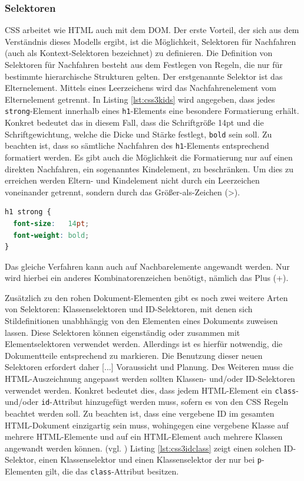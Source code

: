 \subsubsection{Selektoren} CSS arbeitet wie HTML auch mit dem DOM. \glqq Der erste Vorteil, der sich aus dem Verständnis dieses Modells ergibt, ist die Möglichkeit, Selektoren für Nachfahren (auch als Kontext-Selektoren bezeichnet) zu definieren. Die Definition von Selektoren für Nachfahren besteht aus dem Festlegen von Regeln, die nur für bestimmte hierarchische Strukturen gelten.\grqq{}\cite[S.48]{MeyeCasc2005} Der erstgenannte Selektor ist das Elternelement. Mittels eines Leerzeichens wird das Nachfahrenelement vom Elternelement getrennt. In Listing \ref{lst:css3kids} wird angegeben, dass jedes \texttt{strong}-Element innerhalb eines \texttt{h1}-Elements eine besondere Formatierung erhält. Konkret bedeutet das in diesem Fall, dass die Schriftgröße 14pt und die Schriftgewichtung, welche die Dicke und Stärke festlegt, \texttt{bold} sein soll. Zu beachten ist, dass so sämtliche Nachfahren des \texttt{h1}-Elements entsprechend formatiert werden. Es gibt auch die Möglichkeit die Formatierung nur auf einen direkten Nachfahren, ein sogenanntes Kindelement, zu beschränken. Um dies zu erreichen werden Eltern- und Kindelement nicht durch ein Leerzeichen voneinander getrennt, sondern durch das Größer-als-Zeichen (\textgreater).

\vspace{1em}
\begin{lstlisting}[language=CSS, caption=CSS3 Selektoren für Nachfahren, label=lst:css3kids]
h1 strong {
  font-size:   14pt;
  font-weight: bold;
}
\end{lstlisting}

Das gleiche Verfahren kann auch auf Nachbarelemente angewandt werden. Nur wird hierbei ein anderes Kombinatorenzeichen benötigt, nämlich das Plus (+).\par \glqq Zusätzlich zu den rohen Dokument-Elementen gibt es noch zwei weitere Arten von Selektoren: Klassenselektoren und ID-Selektoren, mit denen sich Stildefinitionen unabhhängig von den Elementen eines Dokuments zuweisen lassen. Diese Selektoren können eigenständig oder zusammen mit Elementselektoren verwendet werden. Allerdings ist es hierfür notwendig, die Dokumentteile entsprechend zu markieren. Die Benutzung dieser neuen Selektoren erfordert daher [...] Voraussicht und Planung.\grqq{}\cite[S.34ff]{MeyeCasc2005} Des Weiteren muss die HTML-Auszeichnung angepasst werden sollten Klassen- und/oder ID-Selektoren verwendet werden. Konkret bedeutet dies, dass jedem HTML-Element ein \texttt{class}- und/oder \texttt{id}-Attribut hinzugefügt werden muss, sofern es von den CSS Regeln beachtet werden soll. Zu beachten ist, dass eine vergebene ID im gesamten HTML-Dokument einzigartig sein muss, wohingegen eine vergebene Klasse auf mehrere HTML-Elemente und auf ein HTML-Element auch mehrere Klassen angewandt werden können. (vgl. \cite{W3ScCss2014}) Listing \ref{lst:css3idclass} zeigt einen solchen ID-Selektor, einen Klassenselektor und einen Klassenselektor der nur bei \texttt{p}-Elementen gilt, die das \texttt{class}-Attribut besitzen.

